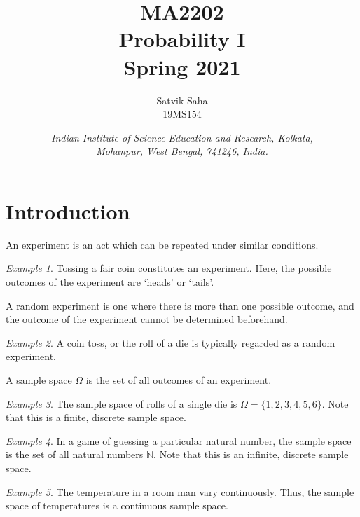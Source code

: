 \documentclass[11pt]{article}
\title{
    \Large\textsc{MA2202} \\
    \Huge \textbf{Probability I} \\
    \vspace{5pt}
    \Large{Spring 2021}
}
\author{
    \large Satvik Saha%
    \\\textsc{\small 19MS154}
}
\date{\normalsize
    \textit{Indian Institute of Science Education and Research, Kolkata, \\
    Mohanpur, West Bengal, 741246, India.} \\
}
\def\N{\mathbb{N}}
\theoremstyle{definition}
\theoremstyle{remark}
\newtheorem*{example}{Example}
\numberwithin{equation}{section}
\begin{document}
    \maketitle

    \section{Introduction}
    \begin{definition}[Experiment]
        An experiment is an act which can be repeated under similar conditions.
    \end{definition}
    \begin{example}
        Tossing a fair coin constitutes an experiment. Here, the possible outcomes
        of the experiment are `heads' or `tails'.
    \end{example}

    \begin{definition}
        A random experiment is one where there is more than one possible outcome, 
        and the outcome of the experiment cannot be determined beforehand.
    \end{definition}
    \begin{example}
        A coin toss, or the roll of a die is typically regarded as a random
        experiment.
    \end{example}
    
    \begin{definition}
        A sample space $\Omega$ is the set of all outcomes of an experiment.
    \end{definition}
    \begin{example}
        The sample space of rolls of a single die is $\Omega = \{1,2,3,4,5,6\}$.
        Note that this is a finite, discrete sample space.
    \end{example}
    \begin{example}
        In a game of guessing a particular natural number, the sample space is the
        set of all natural numbers $\N$. Note that this is an infinite, discrete
        sample space.
    \end{example}
    \begin{example}
        The temperature in a room man vary continuously. Thus, the sample space of
        temperatures is a continuous sample space.
    \end{example}
    
\end{document}
